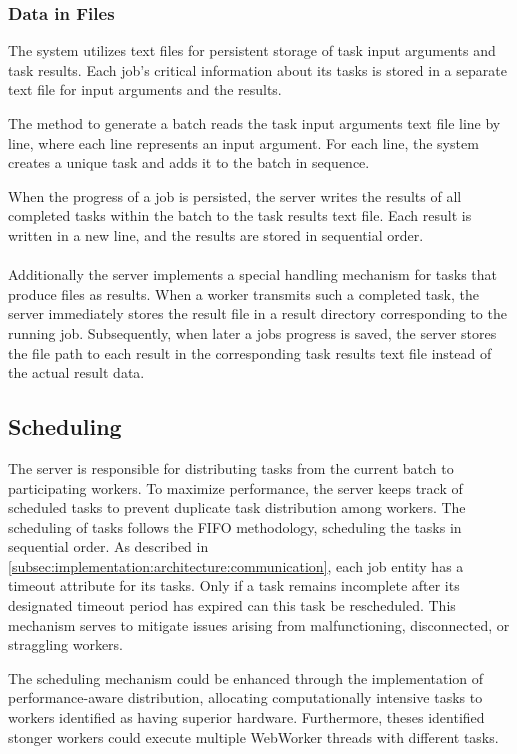 \subsubsection{Data in Files}
The system utilizes text files for persistent storage of task input arguments and task results. Each job's critical information about its tasks is stored in a separate text file for input arguments and the results. 

The method to generate a batch reads the task input arguments text file line by line, where each line represents an input argument. For each line, the system creates a unique task and adds it to the batch in sequence.

When the progress of a job is persisted, the server writes the results of all completed tasks within the batch to the task results text file. Each result is written in a new line, and the results are stored in sequential order.
\\~\\
Additionally the server implements a special handling mechanism for tasks that produce files as results. When a worker transmits such a completed task, the server immediately stores the result file in a result directory corresponding to the running job. Subsequently, when later a jobs progress is saved, the server stores the file path to each result in the corresponding task results text file instead of the actual result data.

\subsection{Scheduling}
\label{subsec:implementation:architecture:scheduling}
The server is responsible for distributing tasks from the current batch to participating workers. To maximize performance, the server keeps track of scheduled tasks to prevent duplicate task distribution among workers. The scheduling of tasks follows the \ac{FIFO} methodology, scheduling the tasks in sequential order. As described in \autoref{subsec:implementation:architecture:communication}, each job entity has a timeout attribute for its tasks. Only if a task remains incomplete after its designated timeout period has expired can this task be rescheduled. This mechanism serves to mitigate issues arising from malfunctioning, disconnected, or straggling workers.

The scheduling mechanism could be enhanced through the implementation of performance-aware distribution, allocating computationally intensive tasks to workers identified as having superior hardware. Furthermore, theses identified stonger workers could execute multiple WebWorker threads with different tasks.

